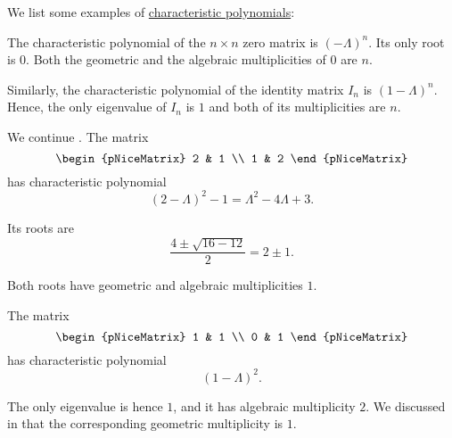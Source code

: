 \begin{example}\label{ex:def:characteristic_polynomial}
  We list some examples of \hyperref[def:characteristic_polynomial]{characteristic polynomials}:
  \begin{thmenum}
     The characteristic polynomial of the \( n \times n \) zero matrix is \( (-\Lambda)^n \). Its only root is \( 0 \). Both the geometric and the algebraic multiplicities of \( 0 \) are \( n \).

     Similarly, the characteristic polynomial of the identity matrix \( I_n \) is \( (1 - \Lambda)^n \). Hence, the only eigenvalue of \( I_n \) is \( 1 \) and both of its multiplicities are \( n \).

     We continue . The matrix
    \begin{equation*}
      \begin{pNiceMatrix}
        2 & 1 \\
        1 & 2
      \end{pNiceMatrix}
    \end{equation*}
    has characteristic polynomial
    \begin{equation*}
      (2 - \Lambda)^2 - 1 = \Lambda^2 - 4\Lambda + 3.
    \end{equation*}

    Its roots are
    \begin{equation*}
      \frac {4 \pm \sqrt{16 - 12}} 2 = 2 \pm 1.
    \end{equation*}

    Both roots have geometric and algebraic multiplicities \( 1 \).

     The matrix
    \begin{equation*}
      \begin{pNiceMatrix}
        1 & 1 \\
        0 & 1
      \end{pNiceMatrix}
    \end{equation*}
    has characteristic polynomial
    \begin{equation*}
      (1 - \Lambda)^2.
    \end{equation*}

    The only eigenvalue is hence \( 1 \), and it has algebraic multiplicity \( 2 \). We discussed in  that the corresponding geometric multiplicity is \( 1 \).
  \end{thmenum}
\end{example}


